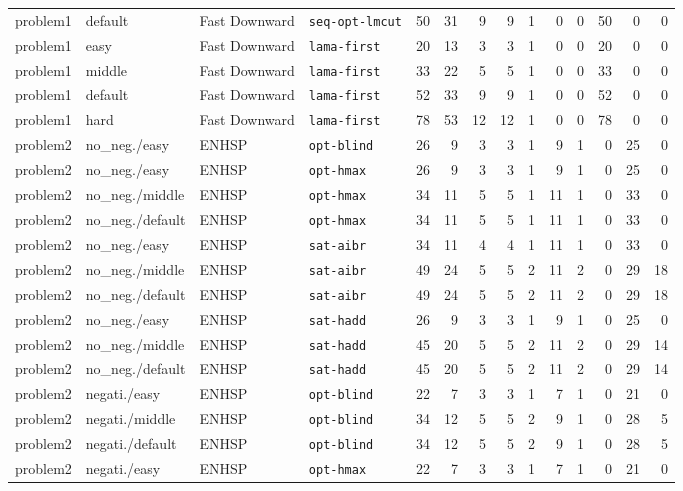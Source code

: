 \begin{table}[htbp]
{\begin{tabular}{llll r rrrrrr rrr}
problem1 & default & Fast Downward & \texttt{seq-opt-lmcut} & 50 & 31 & 9 & 9 & 1 & 0 & 0 & 50 & 0 & 0 \\
problem1 & easy & Fast Downward & \texttt{lama-first} & 20 & 13 & 3 & 3 & 1 & 0 & 0 & 20 & 0 & 0 \\
problem1 & middle & Fast Downward & \texttt{lama-first} & 33 & 22 & 5 & 5 & 1 & 0 & 0 & 33 & 0 & 0 \\
problem1 & default & Fast Downward & \texttt{lama-first} & 52 & 33 & 9 & 9 & 1 & 0 & 0 & 52 & 0 & 0 \\
problem1 & hard & Fast Downward & \texttt{lama-first} & 78 & 53 & 12 & 12 & 1 & 0 & 0 & 78 & 0 & 0 \\
\midrule
problem2 & no\_neg./easy & ENHSP & \texttt{opt-blind} & 26 & 9 & 3 & 3 & 1 & 9 & 1 & 0 & 25 & 0 \\
problem2 & no\_neg./easy & ENHSP & \texttt{opt-hmax} & 26 & 9 & 3 & 3 & 1 & 9 & 1 & 0 & 25 & 0 \\
problem2 & no\_neg./middle & ENHSP & \texttt{opt-hmax} & 34 & 11 & 5 & 5 & 1 & 11 & 1 & 0 & 33 & 0 \\
problem2 & no\_neg./default & ENHSP & \texttt{opt-hmax} & 34 & 11 & 5 & 5 & 1 & 11 & 1 & 0 & 33 & 0 \\
problem2 & no\_neg./easy & ENHSP & \texttt{sat-aibr} & 34 & 11 & 4 & 4 & 1 & 11 & 1 & 0 & 33 & 0 \\
problem2 & no\_neg./middle & ENHSP & \texttt{sat-aibr} & 49 & 24 & 5 & 5 & 2 & 11 & 2 & 0 & 29 & 18 \\
problem2 & no\_neg./default & ENHSP & \texttt{sat-aibr} & 49 & 24 & 5 & 5 & 2 & 11 & 2 & 0 & 29 & 18 \\
problem2 & no\_neg./easy & ENHSP & \texttt{sat-hadd} & 26 & 9 & 3 & 3 & 1 & 9 & 1 & 0 & 25 & 0 \\
problem2 & no\_neg./middle & ENHSP & \texttt{sat-hadd} & 45 & 20 & 5 & 5 & 2 & 11 & 2 & 0 & 29 & 14 \\
problem2 & no\_neg./default & ENHSP & \texttt{sat-hadd} & 45 & 20 & 5 & 5 & 2 & 11 & 2 & 0 & 29 & 14 \\
problem2 & negati./easy & ENHSP & \texttt{opt-blind} & 22 & 7 & 3 & 3 & 1 & 7 & 1 & 0 & 21 & 0 \\
problem2 & negati./middle & ENHSP & \texttt{opt-blind} & 34 & 12 & 5 & 5 & 2 & 9 & 1 & 0 & 28 & 5 \\
problem2 & negati./default & ENHSP & \texttt{opt-blind} & 34 & 12 & 5 & 5 & 2 & 9 & 1 & 0 & 28 & 5 \\
problem2 & negati./easy & ENHSP & \texttt{opt-hmax} & 22 & 7 & 3 & 3 & 1 & 7 & 1 & 0 & 21 & 0 \\

\end{tabular}}
\end{table}
